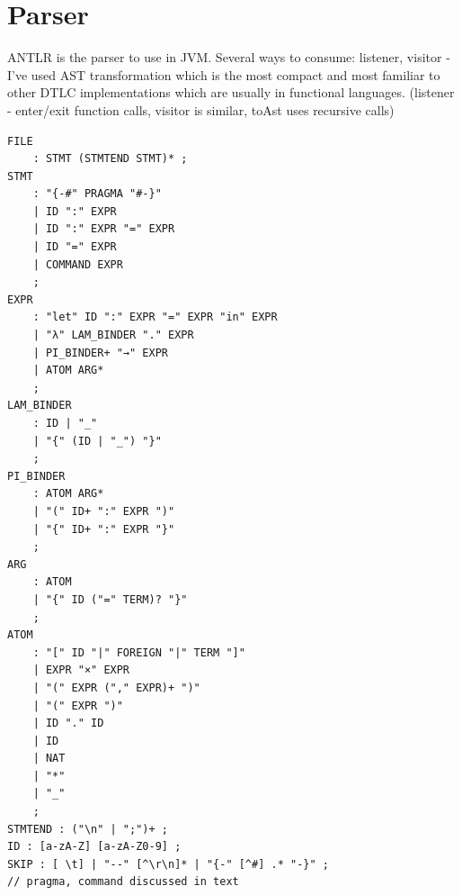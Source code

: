 \documentclass[english,zadani,odsaz]{fitthesis}
\begin{document}
\section{Parser}
\label{sec:org7bcfe15}

ANTLR is the parser to use in JVM. Several ways to consume: listener, visitor -
I've used AST transformation which is the most compact and most familiar to
other DTLC implementations which are usually in functional languages.
(listener - enter/exit function calls, visitor is similar, toAst uses recursive
calls)

\begin{verbatim}
FILE
    : STMT (STMTEND STMT)* ;
STMT
    : "{-#" PRAGMA "#-}"
    | ID ":" EXPR
    | ID ":" EXPR "=" EXPR
    | ID "=" EXPR
    | COMMAND EXPR
    ;
EXPR
    : "let" ID ":" EXPR "=" EXPR "in" EXPR
    | "λ" LAM_BINDER "." EXPR
    | PI_BINDER+ "→" EXPR
    | ATOM ARG*
    ;
LAM_BINDER
    : ID | "_"
    | "{" (ID | "_") "}"
    ;
PI_BINDER
    : ATOM ARG*
    | "(" ID+ ":" EXPR ")"
    | "{" ID+ ":" EXPR "}"
    ;
ARG
    : ATOM
    | "{" ID ("=" TERM)? "}"
    ;
ATOM
    : "[" ID "|" FOREIGN "|" TERM "]"
    | EXPR "×" EXPR
    | "(" EXPR ("," EXPR)+ ")"
    | "(" EXPR ")"
    | ID "." ID
    | ID
    | NAT
    | "*"
    | "_"
    ;
STMTEND : ("\n" | ";")+ ;
ID : [a-zA-Z] [a-zA-Z0-9] ;
SKIP : [ \t] | "--" [^\r\n]* | "{-" [^#] .* "-}" ;
// pragma, command discussed in text
\end{verbatim}
\end{document}

